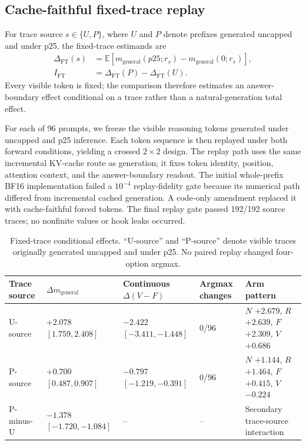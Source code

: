 \documentclass[letterpaper]{article}
\begin{document}
\subsection{Cache-faithful fixed-trace replay}

For trace source $s\in\{U,P\}$, where $U$ and $P$ denote prefixes generated uncapped and under p25, the fixed-trace estimands are
\begin{align}
\Delta_{\mathrm{FT}}(s)
&=\mathbb{E}\!\left[m_{\mathrm{general}}(p25;r_s)-m_{\mathrm{general}}(0;r_s)\right],\\
I_{\mathrm{FT}}&=\Delta_{\mathrm{FT}}(P)-\Delta_{\mathrm{FT}}(U).
\end{align}
Every visible token is fixed; the comparison therefore estimates an answer-boundary effect conditional on a trace rather than a natural-generation total effect.

For each of 96 prompts, we freeze the visible reasoning tokens generated under uncapped and p25 inference.  Each token sequence is then replayed under both forward conditions, yielding a crossed $2\times2$ design.  The replay path uses the same incremental KV-cache route as generation; it fixes token identity, position, attention context, and the answer-boundary readout.  The initial whole-prefix BF16 implementation failed a $10^{-4}$ replay-fidelity gate because its numerical path differed from incremental cached generation.  A code-only amendment replaced it with cache-faithful forced tokens.  The final replay gate passed 192/192 source traces; no nonfinite values or hook leaks occurred.

\begin{table}[t]
\centering
\small
\begin{tabular}{lL{3.0cm}L{3.0cm}L{3.0cm}L{3.5cm}}
\toprule
Trace source & $\Delta m_{\mathrm{general}}$ & Continuous $\Delta(V-F)$ & Argmax changes & Arm pattern \\
\midrule
U-source & $+2.078$ $[1.759,2.408]$ & $-2.422$ $[-3.411,-1.448]$ & 0/96 & $N$ $+2.679$, $R$ $+2.639$, $F$ $+2.309$, $V$ $+0.686$ \\
P-source & $+0.700$ $[0.487,0.907]$ & $-0.797$ $[-1.219,-0.391]$ & 0/96 & $N$ $+1.144$, $R$ $+1.464$, $F$ $+0.415$, $V$ $-0.224$ \\
P-minus-U & $-1.378$ $[-1.720,-1.084]$ & -- & -- & Secondary trace-source interaction \\
\bottomrule
\end{tabular}
\caption{Fixed-trace conditional effects. ``U-source'' and ``P-source'' denote visible traces originally generated uncapped and under p25.  No paired replay changed four-option argmax.}
\label{tab:supp-fixed}
\end{table}
\end{document}
